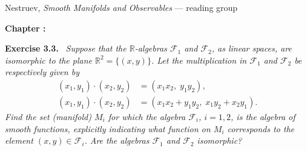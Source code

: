 \documentclass[11pt,a4paper]{article}
\author{Aleksandras Melnik}
\date{\today}
\makeatletter
\newcommand{\dg@chapnum}{}
\newcommand{\dg@chaptitle}{}
\renewcommand{\maketitle}{%
  \begin{center}
    {\small Nestruev, \emph{Smooth Manifolds and Observables} --- reading group}\par
    \vspace{0.6em}
    {\Large\bfseries Chapter \dg@chapnum: \dg@chaptitle}\par
    \vspace{0.4em}
    {\normalsize \@author}\par
    {\small \@date}\par
  \end{center}
  \vspace{1em}}
\theoremstyle{plain}
\theoremstyle{definition}
\theoremstyle{remark}
\newenvironment{exercise}[1]
  {\par\medskip\noindent\textbf{Exercise #1.}\ \itshape}
  {\par\medskip}
\newcommand{\R}{\mathbb{R}}
\newcommand{\F}{\mathcal{F}}            %
\makeatother
\begin{document}
\maketitle

\begin{exercise}{3.3}
Suppose that the $\R$-algebras $\F_1$ and $\F_2$, as linear spaces, are
isomorphic to the plane $\R^2 = \{(x,y)\}$. Let the multiplication in
$\F_1$ and $\F_2$ be respectively given by
\begin{align*}
  (x_1,y_1)\cdot(x_2,y_2) &= (x_1x_2,\; y_1y_2),\\
  (x_1,y_1)\cdot(x_2,y_2) &= (x_1x_2 + y_1y_2,\; x_1y_2 + x_2y_1).
\end{align*}
Find the set (manifold) $M_i$ for which the algebra $\F_i$, $i=1,2$, is
the algebra of smooth functions, explicitly indicating what function on
$M_i$ corresponds to the element $(x,y)\in\F_i$. Are the algebras $\F_1$
and $\F_2$ isomorphic?
\end{exercise}
\end{document}
